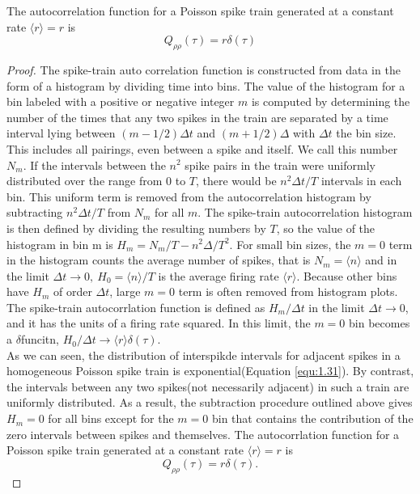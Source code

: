\begin{thm}
    The autocorrelation function for a Poisson spike train generated at a constant rate $\langle r \rangle =r$ is 
    \begin{equation}
        Q_{\rho\rho}(\tau)=r\delta(\tau)
    \end{equation}
    \begin{proof}
        The spike-train auto correlation function is constructed from data in the form of a histogram by dividing time into bins. The value of the histogram for a bin labeled with a positive or negative integer $m$ is computed by determining the number of the times that any two spikes in the train are separated by a time interval lying between $(m-1/2)\Delta t$ and $(m+1/2)\Delta $ with $\Delta t$ the bin size.  This includes all pairings, even  between a spike and itself. We call this number $N_m$. If the intervals between the $n^2$ spike pairs in the train were uniformly distributed over the range from $0$ to $T$, there would be $n^2\Delta t/T$ intervals in each bin. This uniform term is removed from the autocorrelation histogram by subtracting $n^2\Delta t /T$ from $N_m$ for all $m$. The spike-train autocorrelation histogram is then defined by dividing the resulting numbers by $T$, so the value of the histogram in bin m is $H_m=N_m/T-n^2\Delta /T^2$. For small bin sizes, the $m = 0$ term in the histogram counts the average number of spikes,  that is $N_m = \langle n \rangle $ and in the limit $\Delta t \to 0,\ H_0=\langle n \rangle /T$ is the average firing rate $\langle r \rangle$. Because other bins have $H_m$ of order $\Delta t$, large $m = 0$ term is often removed from histogram plots. The spike-train autocorrlation function is defined as $H_m/\Delta t$ in the limit $\Delta t \to 0$, and it has the units of a firing rate squared. In this limit,  the $m = 0$ bin becomes a $\delta $funcitn, $H_0/\Delta t\to \langle r\rangle \delta (\tau)$.\\
        As we can seen, the distribution of interspikde intervals for adjacent spikes in a homogeneous Poisson spike train is exponential(Equation \ref{equ:1.31}). By contrast, the intervals between any two spikes(not necessarily adjacent) in such a train are uniformly distributed. As a result,  the subtraction procedure outlined above gives $H_m=0$ for all bins except for the $m=0$ bin that contains the contribution of the zero intervals between spikes and themselves. The autocorrlation function for a Poisson spike train generated at a constant rate $\langle r\rangle = r$ is 
        $$        Q_{\rho\rho}(\tau)=r\delta(\tau).$$
    \end{proof}
\end{thm}


